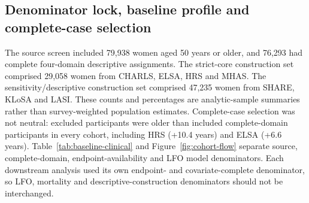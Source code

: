 \documentclass[pdflatex,sn-vancouver-num]{sn-jnl}
\begin{document}
\subsection{Denominator lock, baseline profile and complete-case selection}

The source screen included 79,938 women aged 50 years or older, and 76,293 had complete four-domain descriptive assignments. The strict-core construction set comprised 29,058 women from CHARLS, ELSA, HRS and MHAS. The sensitivity/descriptive construction set comprised 47,235 women from SHARE, KLoSA and LASI. These counts and percentages are analytic-sample summaries rather than survey-weighted population estimates. Complete-case selection was not neutral: excluded participants were older than included complete-domain participants in every cohort, including HRS (+10.4 years) and ELSA (+6.6 years). Table~\ref{tab:baseline-clinical} and Figure~\ref{fig:cohort-flow} separate source, complete-domain, endpoint-availability and LFO model denominators. Each downstream analysis used its own endpoint- and covariate-complete denominator, so LFO, mortality and descriptive-construction denominators should not be interchanged.
\end{document}

